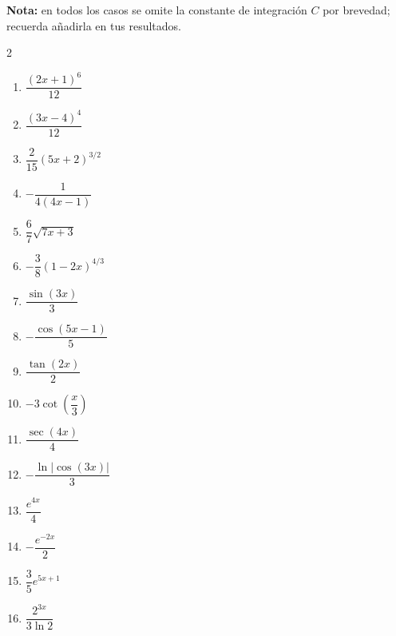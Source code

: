\documentclass[12pt, letterpaper]{article}
\begin{document}

\begin{cuadrosolucion}
\small
\textbf{Nota:} en todos los casos se omite la constante de integración $C$ por brevedad;
recuerda añadirla en tus resultados.
\end{cuadrosolucion}

\vspace{4pt}

\begin{multicols}{2}
\small
\begin{enumerate}[label=\textbf{\arabic*.}, leftmargin=*, itemsep=6pt]

  \item $\dfrac{(2x+1)^6}{12}$
  \item $\dfrac{(3x-4)^4}{12}$
  \item $\dfrac{2}{15}(5x+2)^{3/2}$
  \item $-\dfrac{1}{4(4x-1)}$
  \item $\dfrac{6}{7}\sqrt{7x+3}$
  \item $-\dfrac{3}{8}(1-2x)^{4/3}$
  \item $\dfrac{\sin(3x)}{3}$
  \item $-\dfrac{\cos(5x-1)}{5}$
  \item $\dfrac{\tan(2x)}{2}$
  \item $-3\cot\!\left(\dfrac{x}{3}\right)$
  \item $\dfrac{\sec(4x)}{4}$
  \item $-\dfrac{\ln|\cos(3x)|}{3}$
  \item $\dfrac{e^{4x}}{4}$
  \item $-\dfrac{e^{-2x}}{2}$
  \item $\dfrac{3}{5}e^{5x+1}$
  \item $\dfrac{2^{3x}}{3\ln 2}$


\end{enumerate}
\end{multicols}
\end{document}
